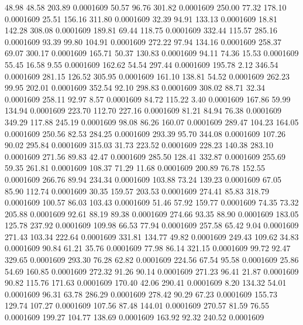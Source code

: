   48.98   48.58  203.89   0.0001609
  50.57   96.76  301.82   0.0001609
 250.00   77.32  178.10   0.0001609
  25.51  156.16  311.80   0.0001609
  32.39   94.91  133.13   0.0001609
  18.81  142.28  308.08   0.0001609
 189.81   69.44  118.75   0.0001609
 332.44  115.57  285.16   0.0001609
  93.39   99.80  104.91   0.0001609
 272.22   97.94  134.16   0.0001609
 258.37   69.07  300.17   0.0001609
 165.71   50.37  130.83   0.0001609
  94.11   74.36   15.53   0.0001609
  55.45   16.58    9.55   0.0001609
 162.62   54.54  297.44   0.0001609
 195.78    2.12  346.54   0.0001609
 281.15  126.52  305.95   0.0001609
 161.10  138.81   54.52   0.0001609
 262.23   99.95  202.01   0.0001609
 352.54   92.10  298.83   0.0001609
 308.02   88.71   32.34   0.0001609
 258.11   92.97    8.57   0.0001609
  84.72  115.22    3.40   0.0001609
 167.86   59.99  134.94   0.0001609
 223.70  112.70  227.16   0.0001609
  81.21   84.94   76.38   0.0001609
 349.29  117.88  245.19   0.0001609
  98.08   86.26  160.07   0.0001609
 289.47  104.23  164.05   0.0001609
 250.56   82.53  284.25   0.0001609
 293.39   95.70  344.08   0.0001609
 107.26   90.02  295.84   0.0001609
 315.03   31.73  223.52   0.0001609
 228.23  140.38  283.10   0.0001609
 271.56   89.83   42.47   0.0001609
 285.50  128.41  332.87   0.0001609
 255.69   59.35  261.81   0.0001609
 108.37   71.29   11.68   0.0001609
 200.89   76.78  152.55   0.0001609
 266.76   89.94  234.34   0.0001609
 103.88   73.24  139.23   0.0001609
  67.05   85.90  112.74   0.0001609
  30.35  159.57  203.53   0.0001609
 274.41   85.83  318.79   0.0001609
 100.57   86.03  103.43   0.0001609
  51.46   57.92  159.77   0.0001609
  74.35   73.32  205.88   0.0001609
  92.61   88.19   89.38   0.0001609
 274.66   93.35   88.90   0.0001609
 183.05  125.78  237.92   0.0001609
 109.98   66.53   77.94   0.0001609
 257.58   65.42    9.04   0.0001609
 271.43  103.34  222.64   0.0001609
 331.81  134.77   49.82   0.0001609
 249.43  109.62   34.83   0.0001609
  90.84   61.21   35.76   0.0001609
  77.98   86.14  321.15   0.0001609
  99.72   92.47  329.65   0.0001609
 293.30   76.28   62.82   0.0001609
 224.56   67.54   95.58   0.0001609
  25.86   54.69  160.85   0.0001609
 272.32   91.26   90.14   0.0001609
 271.23   96.41   21.87   0.0001609
  90.82  115.76  171.63   0.0001609
 170.40   42.06  290.41   0.0001609
   8.20  134.32   54.01   0.0001609
  96.31   63.78  286.29   0.0001609
 278.42   90.29   67.23   0.0001609
 155.73  129.74  107.27   0.0001609
 107.56   87.48  144.01   0.0001609
 270.57   81.59   76.55   0.0001609
 199.27  104.77  138.69   0.0001609
 163.92   92.32  240.52   0.0001609
